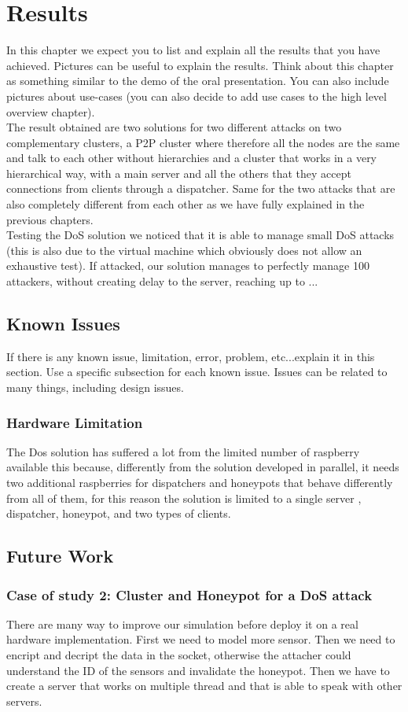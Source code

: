 \chapter{Results}
In this chapter we expect you to list and explain all the results that you have achieved. Pictures can be useful to explain the results. Think about this chapter as something similar to the demo of the oral presentation. You can also include pictures about use-cases (you can also decide to add use cases to the high level overview chapter).
\\
The result obtained are two solutions for two different attacks on two complementary clusters, a P2P cluster where therefore all the nodes are the same and talk to each other without hierarchies and a cluster that works in a very hierarchical way, with a main server and all the others that they accept connections from clients through a dispatcher.
Same for the two attacks that are also completely different from each other as we have fully explained in the previous chapters.
\\
Testing the DoS solution we noticed that it is able to manage small DoS attacks (this is also due to the virtual machine which obviously does not allow an exhaustive test). If attacked, our solution manages to perfectly manage 100 attackers, without creating delay to the server, reaching up to ...

\section{Known Issues}
If there is any known issue, limitation, error, problem, etc...explain it in this section. Use a specific subsection for each known issue. Issues can be related to many things, including design issues.
\subsection{Hardware Limitation}
The Dos solution has suffered a lot from the limited number of raspberry available this because, differently from the solution developed in parallel, it needs two additional raspberries for dispatchers and honeypots that behave differently from all of them, for this reason the solution is limited to a single server , dispatcher, honeypot, and two types of clients.
\section{Future Work}
\subsection{Case of study 2: Cluster and Honeypot for a DoS attack}
There are many way to improve our simulation before deploy it on a real hardware implementation. First we need to model more sensor. Then we need to encript and decript the data in the socket, otherwise the attacher could understand the ID of the sensors and invalidate the honeypot. Then we have to create a server that works on multiple thread and that is able to speak with other servers. 